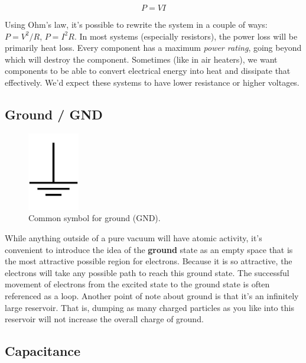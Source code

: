 \documentclass[a4paper]{article}
\begin{document}
\begin{equation} \label{eq:power}
P = VI
\end{equation}

\vspace{0.2cm}
Using Ohm's law, it's possible to rewrite the system in a couple  of ways: $P=V^2/R$, $P=I^2R$. In most systems (especially resistors), the power loss will be primarily heat loss. Every component has a maximum \textit{power rating}, going beyond which will destroy the component. Sometimes (like in air heaters), we want components to be able to convert electrical energy into heat and dissipate that effectively. We'd expect these systems to have lower resistance or higher voltages.

\subsection{Ground / GND}

\begin{figure}[!b]
  \begin{center}
    \includegraphics[width=0.2\textwidth]{gnd.png}
  \end{center}
  \caption{\label{fig:gnd}Common symbol for ground (GND).}
\end{figure}

While anything outside of a pure vacuum will have atomic activity, it's convenient to introduce the idea of the \textbf{ground} state as an empty space that is the most attractive possible region for electrons. Because it is so attractive, the electrons will take any possible path to reach this ground state. The successful movement of electrons from the excited state to the ground state is often referenced as a loop. Another point of note about ground is that it's an infinitely large reservoir. That is, dumping as many charged particles as you like into this reservoir will not increase the overall charge of ground.

\newpage

\subsection{Capacitance}
\end{document}
